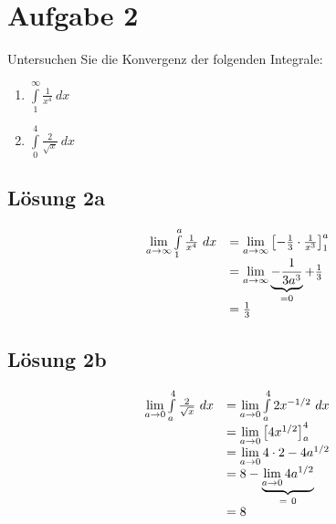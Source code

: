 \documentclass[main.tex]{subfiles}
\begin{document}
\section{Aufgabe 2}
Untersuchen Sie die Konvergenz der folgenden Integrale:

\begin{enumerate}
    \item $\int\limits _{1}^{\infty }\frac{1}{x^{4}} \ dx$
    \item $\int\limits _{0}^{4}\frac{2}{\sqrt{x}} \ dx$
\end{enumerate}

\subsection{Lösung 2a}
\begin{equation*}
    \begin{array}{ c l }
        \lim\limits _{a\rightarrow \infty }\int\limits _{1}^{a}\frac{1}{x^{4}} \ dx & =\lim\limits _{a\rightarrow \infty }\left[ -\frac{1}{3} \cdotp \frac{1}{x^{3}}\right]_{1}^{a}\\
        & =\lim\limits _{a\rightarrow \infty }\underbrace{-\frac{1}{3a^{3}}}_{=0} +\frac{1}{3}\\
        & =\frac{1}{3}
    \end{array}
\end{equation*}

\subsection{Lösung 2b}

\begin{equation*}
    \begin{array}{ c l }
        \lim\limits _{a\rightarrow 0}\int\limits _{a}^{4}\frac{2}{\sqrt{x}} \ dx & =\lim\limits _{a\rightarrow 0}\int\limits _{a}^{4} 2x^{-1/2} \ dx\\
        & =\lim\limits _{a\rightarrow 0}\left[ 4x^{1/2}\right]_{a}^{4}\\
        & =\lim\limits _{a\rightarrow 0} 4\cdotp 2-4a^{1/2}\\
        & =8-\underbrace{\lim\limits _{a\rightarrow 0} 4a^{1/2}}_{=\ 0}\\
        & =8
    \end{array}
\end{equation*}
\end{document}
